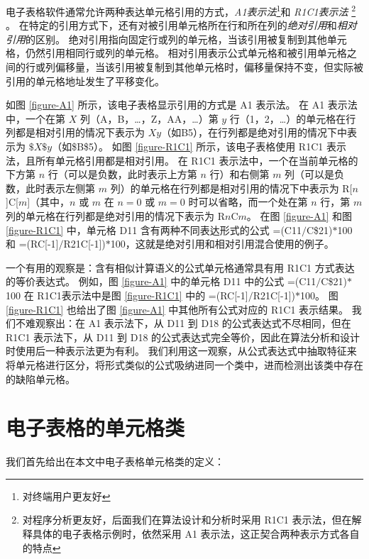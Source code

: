 


电子表格软件通常允许两种表达单元格引用的方式，\textit{A1表示法}\footnote{对终端用户更友好}和 \textit{R1C1表示法} \footnote{对程序分析更友好，后面我们在算法设计和分析时采用 R1C1 表示法，但在解释具体的电子表格示例时，依然采用 A1 表示法，这正契合两种表示方式各自的特点} \cite{tan2014bug}。
在特定的引用方式下，还有对被引用单元格所在行和所在列的\textit{绝对引用}和\textit{相对引用}的区别。
绝对引用指向固定行或列的单元格，当该引用被复制到其他单元格，仍然引用相同行或列的单元格。
相对引用表示公式单元格和被引用单元格之间的行或列偏移量，当该引用被复制到其他单元格时，偏移量保持不变，但实际被引用的单元格地址发生了平移变化。

如图 \ref{figure-A1} 所示，该电子表格显示引用的方式是 A1 表示法。
在 A1 表示法中，一个在第 $X$ 列（A，B，\dots，Z，AA，\dots）第 $y$ 行（1，2，\dots）的单元格在行列都是相对引用的情况下表示为 $Xy$（如B5），在行列都是绝对引用的情况下中表示为 $\$X\$y$（如\$B\$5）。
如图 \ref{figure-R1C1} 所示，该电子表格使用 R1C1 表示法，且所有单元格引用都是相对引用。
在 R1C1 表示法中，一个在当前单元格的下方第 $n$ 行（可以是负数，此时表示上方第 $n$ 行）和右侧第 $m$ 列（可以是负数，此时表示左侧第 $m$ 列）的单元格在行列都是相对引用的情况下中表示为 R[$n$]C[$m$]（其中，$n$ 或 $m$ 在 $n=0$ 或 $m=0$ 时可以省略，而一个处在第 $n$ 行，第 $m$ 列的单元格在行列都是绝对引用的情况下表示为 R$n$C$m$。
在图 \ref{figure-A1} 和图 \ref{figure-R1C1} 中，单元格 D11 含有两种不同表达形式的公式 =(C11$/$C\$21)$*$100 和 =(RC[-1]$/$R21C[-1])$*$100，这就是绝对引用和相对引用混合使用的例子。

一个有用的观察是：含有相似计算语义的公式单元格通常具有用 R1C1 方式表达的等价表达式。
例如，图 \ref{figure-A1} 中的单元格 D11 中的公式 =(C11$/$C\$21)$*$100 在 R1C1表示法中是图 \ref{figure-R1C1} 中的 =(RC[-1]$/$R21C[-1])$*$100。
图 \ref{figure-R1C1} 也给出了图 \ref{figure-A1} 中其他所有公式对应的 R1C1 表示结果。
我们不难观察出：在 A1 表示法下，从 D11 到 D18 的公式表达式不尽相同，但在 R1C1 表示法下，从 D11 到 D18 的公式表达式完全等价，因此在算法分析和设计时使用后一种表示法更为有利。
我们利用这一观察，从公式表达式中抽取特征来将单元格进行区分，将形式类似的公式吸纳进同一个类中，进而检测出该类中存在的缺陷单元格。




\section{电子表格的单元格类}
我们首先给出在本文中电子表格单元格类的定义：

